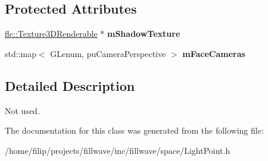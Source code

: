 \subsection*{Protected Attributes}
\begin{DoxyCompactItemize}
\item 
\mbox{\label{classflw_1_1flf_1_1LightPoint_aad378f3ce76565ce6bbcb0f06722152d}} 
\hyperlink{classflw_1_1flc_1_1Texture3DRenderable}{flc\+::\+Texture3\+D\+Renderable} $\ast$ {\bfseries m\+Shadow\+Texture}
\item 
\mbox{\label{classflw_1_1flf_1_1LightPoint_a0397b288ef6882c6a57cd07dbba58d1e}} 
std\+::map$<$ G\+Lenum, pu\+Camera\+Perspective $>$ {\bfseries m\+Face\+Cameras}
\end{DoxyCompactItemize}


\subsection{Detailed Description}
Not used. 

The documentation for this class was generated from the following file\+:\begin{DoxyCompactItemize}
\item 
/home/filip/projects/fillwave/inc/fillwave/space/Light\+Point.\+h\end{DoxyCompactItemize}
